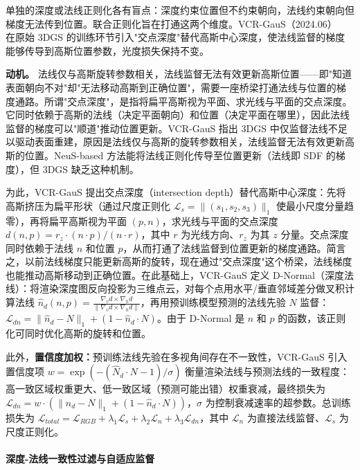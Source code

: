 单独的深度或法线正则化各有盲点：深度约束位置但不约束朝向，法线约束朝向但梯度无法传到位置。联合正则化旨在打通这两个维度。VCR-GauS（2024.06）~\cite{2406_05774} 在原始 3DGS 的训练环节引入"交点深度"替代高斯中心深度，使法线监督的梯度能够传导到高斯位置参数，光度损失保持不变。

\textbf{动机。} 法线仅与高斯旋转参数相关，法线监督无法有效更新高斯位置——即"知道表面朝向不对"却"无法移动高斯到正确位置"，需要一座桥梁打通法线与位置的梯度通路。所谓"交点深度"，是指将扁平高斯视为平面、求光线与平面的交点深度。它同时依赖于高斯的法线（决定平面朝向）和位置（决定平面在哪里），因此法线监督的梯度可以"顺道"推动位置更新。VCR-GauS 指出 3DGS 中仅监督法线不足以驱动表面重建，原因是法线仅与高斯的旋转参数相关，法线监督无法有效更新高斯的位置。NeuS-based 方法能将法线正则化传导至位置更新（法线即 SDF 的梯度），但 3DGS 缺乏这种机制。

为此，VCR-GauS 提出交点深度（intersection depth）替代高斯中心深度：先将高斯挤压为扁平形状（通过尺度正则化 $\mathcal{L}_s = \|(s_1, s_2, s_3)\|_1$ 使最小尺度分量趋零），再将扁平高斯视为平面 $(p, n)$，求光线与平面的交点深度 $d(n, p) = r_z \cdot (n \cdot p) / (n \cdot r)$，其中 $r$ 为光线方向、$r_z$ 为其 $z$ 分量。交点深度同时依赖于法线 $n$ 和位置 $p$，从而打通了法线监督到位置更新的梯度通路。简言之，以前法线梯度只能更新高斯的旋转，现在通过"交点深度"这个桥梁，法线梯度也能推动高斯移动到正确位置。在此基础上，VCR-GauS 定义 D-Normal（深度法线）：将渲染深度图反向投影为三维点云，对每个点用水平/垂直邻域差分做叉积计算法线 $\hat{n}_d(n, p) = \frac{\nabla_v d \times \nabla_h d}{\|\nabla_v d \times \nabla_h d\|}$，再用预训练模型预测的法线先验 $N$ 监督：$\mathcal{L}_{dn} = \|\hat{n}_d - N\|_1 + (1 - \hat{n}_d \cdot N)$。由于 D-Normal 是 $n$ 和 $p$ 的函数，该正则化可同时优化高斯的旋转和位置。

此外，\textbf{置信度加权：}预训练法线先验在多视角间存在不一致性，VCR-GauS 引入置信度项 $w = \exp(-(\hat{N}_d \cdot N - 1) / \sigma)$ 衡量渲染法线与预测法线的一致程度：高一致区域权重更大、低一致区域（预测可能出错）权重衰减，最终损失为 $\mathcal{L}_{dn} = w \cdot (\|\hat{n}_d - N\|_1 + (1 - \hat{n}_d \cdot N))$，$\sigma$ 为控制衰减速率的超参数。总训练损失为 $\mathcal{L}_{total} = \mathcal{L}_{RGB} + \lambda_1 \mathcal{L}_s + \lambda_2 \mathcal{L}_n + \lambda_3 \mathcal{L}_{dn}$，其中 $\mathcal{L}_n$ 为直接法线监督、$\mathcal{L}_s$ 为尺度正则化。

\paragraph{深度-法线一致性过滤与自适应监督}

